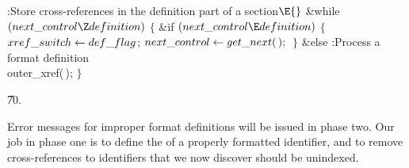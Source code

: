 \Y\B\4:Store cross-references in the definition part of a section\X${}%
\E{}$\6
\&{while} ${}(\\{next\_control}\Z\\{definition}){}$\5
${}\{{}$\1\6
\&{if} ${}(\\{next\_control}\E\\{definition}){}$\5
${}\{{}$\1\6
${}\\{xref\_switch}\leftarrow\\{def\_flag}{}$;\6
${}\\{next\_control}\leftarrow\\{get\_next}(\,);{}$\6
\4${}\}{}$\2\6
\&{else}\1\5
:Process a format definition\X\2\6
\\{outer\_xref}(\,);\6
\4${}\}{}$\2\par
\U70.\fi

Error messages for improper format definitions will be issued in phase
two. Our job in phase one is to define the  of a properly formatted
identifier, and to remove cross-references to identifiers that we now
discover should be unindexed.

